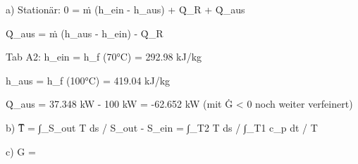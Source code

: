 a) Stationär: 0 = ṁ (h_ein - h_aus) + Q̇_R + Q̇_aus

Q̇_aus = ṁ (h_aus - h_ein) - Q̇_R

Tab A2: h_ein = h_f (70°C) = 292.98 kJ/kg

h_aus = h_f (100°C) = 419.04 kJ/kg

Q̇_aus = 37.348 kW - 100 kW = -62.652 kW (mit Ġ < 0 noch weiter verfeinert)

b) T̅ = ∫_S_out T ds / S_out - S_ein = ∫_T2 T ds / ∫_T1 c_p dt / T

c) G =